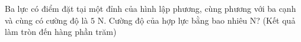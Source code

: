 \begin{ex}%
    Ba lực có điểm đặt tại một đỉnh của hình lập phương, cùng phương với ba cạnh và cùng có cường độ là $5$ N. Cường độ của hợp lực bằng bao nhiêu N? (Kết quả làm tròn đến hàng phần trăm)
\end{ex}

